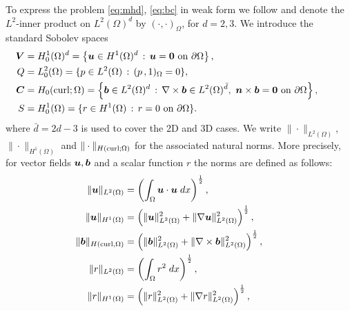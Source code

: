  To express the problem \eqref{eq:mhd}, \eqref{eq:bc} in weak form we follow \cite{schotzau2004mixed} and denote the $L^2$-inner product on $L^2(\Omega)^d$ by $(\cdot,\cdot)_\Omega$, for $d = 2,3$. We introduce the standard Sobolev spaces
\begin{equation} \label{eq:FuncSpace}
 \left. \begin{aligned}
\hspace{-1.5mm}\boldsymbol V&=H_0^1(\Omega)^d=\left\{\boldsymbol u\in H^1(\Omega)^d\,:\,\text{$\boldsymbol u=\boldsymbol 0$ on $\partial\Omega$}\right\},\\
\hspace{-1.5mm}Q&=L^2_0(\Omega)=\{p\in L^2(\Omega)\,:\,(p\,,1)_\Omega=0\},\\
\hspace{-1.5mm}\boldsymbol C&=H_0({\rm curl};\Omega) = \left\{\boldsymbol b\in L^2(\Omega)^d\,:\,\nabla\times\boldsymbol b\in L^2(\Omega)^{\bar{d}}, \
\text{$\boldsymbol n\times\boldsymbol b=\boldsymbol 0$ on $\partial\Omega$}\right\},\\
\hspace{-1.5mm}S&=H^1_0(\Omega)=\{r\in H^1(\Omega)\,:\,r=0\ \mbox{on $\partial\Omega$}\}.
 \end{aligned}
 \right.
 \qquad \text{}
\end{equation}
where $\bar{d}={2d-3}$ is used to cover the 2D and 3D cases. We write $\|\cdot\|_{L^2(\Omega)}$, $\|\cdot\|_{H^1(\Omega)}$ and $\|\cdot\|_{H(\rm{curl};\Omega)}$ for the associated natural norms. More precisely, for  vector fields $\boldsymbol u,\boldsymbol b$ and a scalar function $r$ the norms are defined as follows:
\begin{equation} \nonumber
 \left. \begin{aligned}
    \|\boldsymbol u\|_{L^2 (\Omega)} &= \left({\int_{\Omega} \boldsymbol u\cdot\boldsymbol u\;dx}\right)^{\frac{1}{2}},\\
   \|\boldsymbol u\|_{H^1(\Omega)} &=  \left(\|\boldsymbol u\|_{L^2(\Omega)}^2 + \|\nabla  \boldsymbol u\|_{L^2(\Omega)}^2 \right)^{\frac{1}{2}},\\
   \|\boldsymbol b\|_{H(\rm{curl},\Omega)} &=  \left(\|\boldsymbol b\|_{L^2(\Omega)}^2 + \|\nabla \times \boldsymbol b\|_{L^2(\Omega)}^2 \right)^{\frac{1}{2}}, \\
    \|r\|_{L^2 (\Omega)} &= \left({\int_{\Omega} r^2\;dx}\right)^{\frac{1}{2}},\\
    \|r\|_{H^1(\Omega)} &=  \left(\|r\|_{L^2(\Omega)}^2 + \|\nabla  r\|_{L^2(\Omega)}^2 \right)^{\frac{1}{2}},\\
 \end{aligned}
 \right.
 \qquad \text{}
\end{equation}
